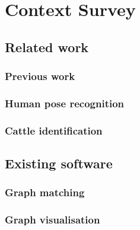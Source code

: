 \section{Context Survey}

\subsection{Related work}

\subsubsection{Previous work}
\cite{lobster-thesis}

\subsubsection{Human pose recognition}
\cite{human-pose}
\subsubsection{Cattle identification}

\subsection{Existing software}

\subsubsection{Graph matching}
\cite{graphgrep} \cite{appagato}

\subsubsection{Graph visualisation}
\cite{gephi}
